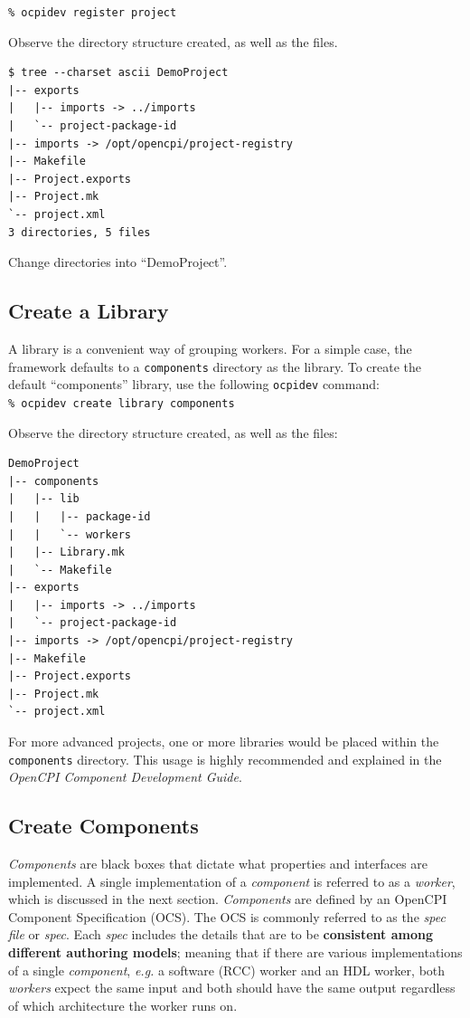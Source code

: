 \forceindent\forceindent\verb+% ocpidev register project+\\

Observe the directory structure created, as well as the files.\\

\bstart
\begin{verbatim}
$ tree --charset ascii DemoProject
|-- exports
|   |-- imports -> ../imports
|   `-- project-package-id
|-- imports -> /opt/opencpi/project-registry
|-- Makefile
|-- Project.exports
|-- Project.mk
`-- project.xml
3 directories, 5 files
\end{verbatim}
\bend
Change directories into ``DemoProject''.

\subsection{Create a Library}
A library is a convenient way of grouping workers. For a simple case, the framework defaults to a \verb+components+ directory as the library. To create the default ``components'' library, use the following \verb+ocpidev+ command:\\

\forceindent\verb+% ocpidev create library components+\\
\OcpidevCreate{}

\bstart
Observe the directory structure created, as well as the files:
\begin{verbatim}
DemoProject
|-- components
|   |-- lib
|   |   |-- package-id
|   |   `-- workers
|   |-- Library.mk
|   `-- Makefile
|-- exports
|   |-- imports -> ../imports
|   `-- project-package-id
|-- imports -> /opt/opencpi/project-registry
|-- Makefile
|-- Project.exports
|-- Project.mk
`-- project.xml

\end{verbatim}
\bend
For more advanced projects, one or more libraries would be placed within the \verb+components+ directory. This usage is highly recommended and explained in the \textit{OpenCPI Component Development Guide}.

\subsection{Create Components}
\textit{Components} are black boxes that dictate what properties and interfaces are implemented. A single implementation of a \textit{component} is referred to as a \textit{worker}, which is discussed in the next section. \textit{Components} are defined by an OpenCPI Component Specification (OCS). The OCS is commonly referred to as the \textit{spec file} or \textit{spec}. Each \textit{spec} includes the details that are to be \textbf{consistent among different authoring models}; meaning that if there are various implementations of a single \textit{component}, \textit{e.g.} a software (RCC) worker and an HDL worker, both \textit{workers} expect the same input and both should have the same output regardless of which architecture the worker runs on.\newline

